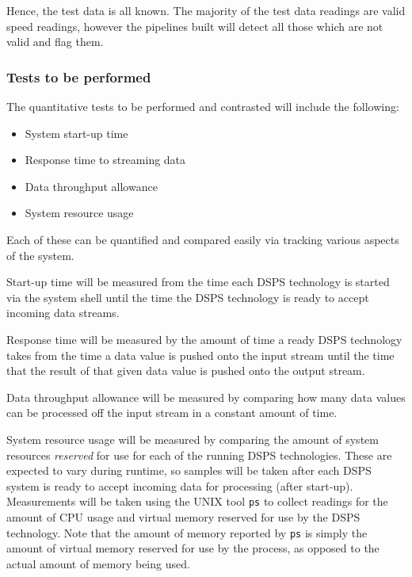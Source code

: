 Hence, the test data is all known. The majority of the test data readings are valid speed readings, however the pipelines
built will detect all those which are not valid and flag them.



\subsubsection{Tests to be performed} %
\label{ssub:tests_to_be_performed}

The quantitative tests to be performed and contrasted will include the following:

\begin{itemize}
  \item System start-up time
  \item Response time to streaming data
  \item Data throughput allowance
  \item System resource usage
\end{itemize}

Each of these can be quantified and compared easily via tracking various aspects of the system.

Start-up time will
be measured from the time each DSPS technology is started via the system shell until the time the DSPS technology is
ready to accept incoming data streams.

Response time will be measured by the amount of time a ready DSPS technology takes from the time a data value is pushed
onto the input stream until the time that the result of that given data value is pushed onto the output stream.

Data throughput allowance will be measured by comparing how many data values can be processed off the input stream in a
constant amount of time.

System resource usage will be measured by comparing the amount of system resources \textit{reserved} for use for each
of the running DSPS technologies. These are expected to vary during runtime, so samples will be taken after each DSPS
system is ready to accept incoming data for processing (after start-up). Measurements will be taken using the UNIX tool
\texttt{ps} to collect readings for the amount of CPU usage and virtual memory reserved for use by the DSPS technology.
Note that the amount of memory reported by \texttt{ps} is simply the amount of virtual memory reserved for use by the
process, as opposed to the actual amount of memory being used.

